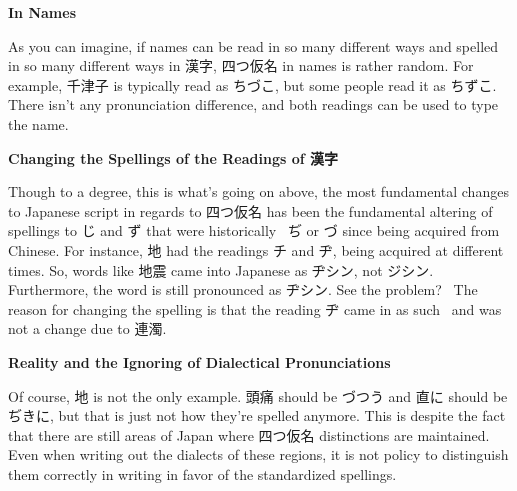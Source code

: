 \begin{center}
 \textbf{In Names }
\end{center}

\par{ As you can imagine, if names can be read in so many different ways and spelled in so many different ways in 漢字, 四つ仮名 in names is rather random. For example, 千津子 is typically read as ちづこ, but some people read it as ちずこ. There isn't any pronunciation difference, and both readings can be used to type the name. }

\begin{center}
 \textbf{Changing the Spellings of the Readings of 漢字 }
\end{center}

\par{ Though to a degree, this is what's going on above, the most fundamental changes to Japanese script in regards to 四つ仮名 has been the fundamental altering of spellings to じ and ず that were historically  ぢ or づ since being acquired from Chinese. For instance, 地 had the readings チ and ヂ, being acquired at different times. So, words like 地震 came into Japanese as ヂシン, not ジシン. Furthermore, the word is still pronounced as ヂシン. See the problem?  The reason for changing the spelling is that the reading ヂ came in as such  and was not a change due to 連濁. }

\begin{center}
 \textbf{Reality and the Ignoring of Dialectical Pronunciations }
\end{center}

\par{ Of course, 地 is not the only example. 頭痛 should be づつう and 直に should be ぢきに, but that is just not how they're spelled anymore. This is despite the fact that there are still areas of Japan where 四つ仮名 distinctions are maintained. Even when writing out the dialects of these regions, it is not policy to distinguish them correctly in writing in favor of the standardized spellings. }

